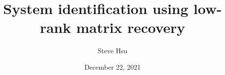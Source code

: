 \documentclass[aspectratio=169]{beamer}
\title{System identification using low-rank matrix recovery}
\author{Steve Hsu}
\date{December 22, 2021}
\begin{document}
\frame{\titlepage}




\end{document}

